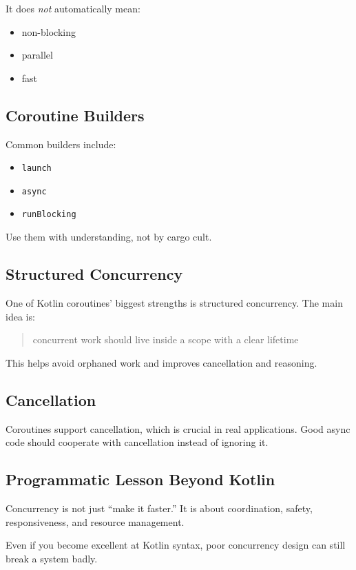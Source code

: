 \documentclass[11pt,a4paper]{article}
\begin{document}
It does \emph{not} automatically mean:
\begin{itemize}
    \item non-blocking
    \item parallel
    \item fast
\end{itemize}

\subsection{Coroutine Builders}

Common builders include:
\begin{itemize}
    \item \texttt{launch}
    \item \texttt{async}
    \item \texttt{runBlocking}
\end{itemize}

Use them with understanding, not by cargo cult.

\subsection{Structured Concurrency}

One of Kotlin coroutines' biggest strengths is structured concurrency. The main idea is:

\begin{quote}
concurrent work should live inside a scope with a clear lifetime
\end{quote}

This helps avoid orphaned work and improves cancellation and reasoning.

\subsection{Cancellation}

Coroutines support cancellation, which is crucial in real applications. Good async code should cooperate with cancellation instead of ignoring it.

\subsection{Programmatic Lesson Beyond Kotlin}

Concurrency is not just ``make it faster.'' It is about coordination, safety, responsiveness, and resource management.

Even if you become excellent at Kotlin syntax, poor concurrency design can still break a system badly.
\end{document}
